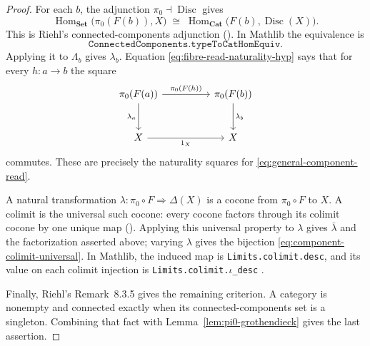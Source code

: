 \documentclass[11pt]{article}
\theoremstyle{plain}
\theoremstyle{definition}
\theoremstyle{remark}
\begin{document}
\begin{proof}
For each $b$, the adjunction
$\pi_0\dashv\operatorname{Disc}$ gives
\[
  \operatorname{Hom}_{\mathbf{Set}}\bigl(\pi_0(F(b)),X\bigr)
  \;\cong\;
  \operatorname{Hom}_{\mathbf{Cat}}
    \bigl(F(b),\operatorname{Disc}(X)\bigr).
                                                        \tag{A}\label{eq:fibre-pi0-adjunction}
\]
This is Riehl's connected-components adjunction
\textup{(}\cite[\S8.3, Rem.~8.3.5]{Riehl}\textup{)}. In Mathlib the
equivalence is
\[
  \texttt{ConnectedComponents.typeToCatHomEquiv}.
\]
Applying it to $\Lambda_b$ gives $\lambda_b$. Equation
\eqref{eq:fibre-read-naturality-hyp} says that for every $h:a\to b$ the
square
\[
\begin{tikzcd}[column sep=huge,row sep=large]
\pi_0(F(a)) \arrow[r,"{\pi_0(F(h))}"] \arrow[d,"{\lambda_a}"'] &
\pi_0(F(b)) \arrow[d,"{\lambda_b}"] \\
X \arrow[r,"1_X"'] & X
\end{tikzcd}
\]
commutes. These are precisely the naturality squares for
\eqref{eq:general-component-read}.

A natural transformation
$\lambda:\pi_0\circ F\Rightarrow\Delta(X)$ is a cocone from
$\pi_0\circ F$ to $X$. A colimit is the universal such cocone: every cocone
factors through its colimit cocone by one unique map
\textup{(}\cite[\S3.1, Defs.~3.1.5--3.1.6]{RiehlContext}\textup{)}.
Applying this universal property to $\lambda$ gives $\bar\lambda$ and the
factorization asserted above; varying $\lambda$ gives the bijection
\eqref{eq:component-colimit-universal}. In Mathlib, the induced map is
\texttt{Limits.colimit.desc}, and its value on each colimit injection is
\texttt{Limits.colimit.}$\iota$\texttt{\_desc} \cite{Mathlib}.

Finally, Riehl's Remark~8.3.5 gives the remaining criterion. A category is
nonempty and connected exactly when its connected-components set is a
singleton. Combining that fact with Lemma~\ref{lem:pi0-grothendieck} gives the
last assertion.
\end{proof}
\end{document}
